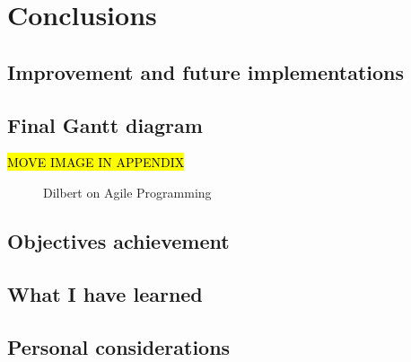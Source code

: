 \chapter{Conclusions}
\label{conclusions}

\section{Improvement and future implementations}
%
%

\section{Final Gantt diagram}
%	
	\hl{MOVE IMAGE IN APPENDIX}
	\begin{figure}[H]
		\centering
		\caption{Dilbert on Agile Programming}
	\end{figure}
	
\section{Objectives achievement}

\section{What I have learned}

\section{Personal considerations}

